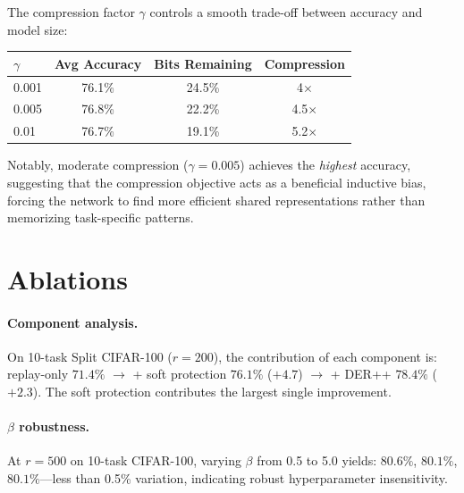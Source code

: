 \documentclass[11pt]{article}
\begin{document}
The compression factor $\gamma$ controls a smooth trade-off between accuracy and model size:
\begin{center}
\small
\begin{tabular}{lccc}
\toprule
$\gamma$ & Avg Accuracy & Bits Remaining & Compression \\
\midrule
0.001 & 76.1\% & 24.5\% & 4$\times$ \\
0.005 & 76.8\% & 22.2\% & 4.5$\times$ \\
0.01 & 76.7\% & 19.1\% & 5.2$\times$ \\
\bottomrule
\end{tabular}
\end{center}
Notably, moderate compression ($\gamma = 0.005$) achieves the \textit{highest} accuracy, suggesting that the compression objective acts as a beneficial inductive bias, forcing the network to find more efficient shared representations rather than memorizing task-specific patterns.

\section{Ablations}
\label{sec:ablations}

\paragraph{Component analysis.}
On 10-task Split CIFAR-100 ($r=200$), the contribution of each component is:
replay-only $71.4\%$ $\rightarrow$ + soft protection $76.1\%$ ($+4.7$) $\rightarrow$ + DER++ $78.4\%$ ($+2.3$).
The soft protection contributes the largest single improvement.

\paragraph{$\beta$ robustness.}
At $r=500$ on 10-task CIFAR-100, varying $\beta$ from 0.5 to 5.0 yields: $80.6\%$, $80.1\%$, $80.1\%$---less than 0.5\% variation, indicating robust hyperparameter insensitivity.
\end{document}
